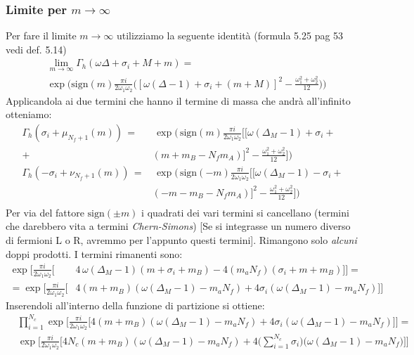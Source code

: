 \documentclass[a4paper,12pt]{report}
\newcommand{\sign}{\mbox{sign}}
\begin{document}
\subsubsection{Limite per $m \rightarrow \infty$}
Per fare il limite $m \rightarrow \infty$ utilizziamo la seguente identità \citep{Aharony:2013dha} (formula 5.25 pag 53 vedi def. 5.14)
\begin{align*}
 &\lim_{ m \rightarrow \infty } \Gamma_h ( \omega \Delta + \sigma_i + M + m) = \\
& \exp \bigg( \mbox{sign} (m) \frac{\pi i }{2 \omega_1 \omega_2} \bigg( [ \omega (\Delta
 -1) + \sigma_i + (m+M)]^2 - \frac{\omega_1^2 + \omega_2^2}{12} \bigg) \bigg)
\end{align*} 
Applicandola ai due termini che hanno il termine di massa che andrà all'infinito otteniamo:
\begin{align*}
\Gamma_h ( \sigma_i + \mu_{N_f+1}(m)) \, = &\, \exp \bigg( \, \mbox{sign}(m) \frac{\pi i}{2 \omega_1 \omega_2 } \big[ [ \omega (\Delta_M - 1) + \sigma_i + \\
+ & ( m + m_B - N_f m_A)]^2 - \frac{ \omega_1^2 + \omega_2^2 }{12} \big] \bigg )\\
\Gamma_h ( - \sigma_i + \nu_{N_f+1}(m)) \, = &\, \exp \bigg( \, \mbox{sign}(-m) \frac{\pi i}{2 \omega_1 \omega_2 } \big[ [ \omega (\Delta_M - 1) - \sigma_i + \\
&( - m - m_B - N_f m_A)]^2 - \frac{ \omega_1^2 + \omega_2^2 }{12} \big] \bigg )\\
\end{align*}
Per via del fattore $\sign(\pm m)$ i quadrati dei vari termini si cancellano (termini che darebbero vita a termini \emph{Chern-Simons})
[Se si integrasse un numero diverso di fermioni L o R, avremmo per l'appunto questi termini]. Rimangono solo \emph{alcuni} doppi prodotti. I termini rimanenti sono:
\begin{align*}
\exp \bigg[ \frac{\pi i}{2 \omega_1 \omega_2 } \bigg[& 4 \,  \omega (\Delta_M - 1) ( m + \sigma_i + m_B )  - 4 ( m_a N_f) ( \sigma_i + m + m_B) \bigg] \bigg]  = \\
 = \exp \bigg[ \frac{\pi i}{2 \omega_1 \omega_2 } \bigg[& 4  ( m  + m_B ) ( \omega (\Delta_M - 1) -  m_a N_f ) + 	4 \sigma_i  (\omega (\Delta_M - 1) -  m_a N_f)  \bigg] \bigg]
\end{align*}
Inserendoli all'interno della funzione di partizione si ottiene:
\begin{align*}
 &\prod_{i=1}^{N_c} \exp \bigg[ \frac{\pi i}{2 \omega_1 \omega_2 } \bigg[ 4  ( m  + m_B ) ( \omega (\Delta_M - 1) -  m_a N_f ) + 	4 \sigma_i  (\omega (\Delta_M - 1) -  m_a N_f)\bigg] \bigg] = \\
 &\exp \bigg[ \frac{\pi i}{2 \omega_1 \omega_2 } \bigg[ 4 N_c  ( m  + m_B ) ( \omega (\Delta_M - 1) -  m_a N_f ) +4\big( \sum_{i=1}^{N_c}	 \sigma_i  \big) \big(\omega (\Delta_M - 1) -  m_a N_f \big)  \bigg] \bigg] \\
\end{align*}
\end{document}
